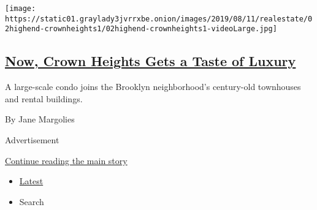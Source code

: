 \begin{enumerate}
  \texttt{[image: https://static01.graylady3jvrrxbe.onion/images/2019/08/11/realestate/02highend-crownheights1/02highend-crownheights1-videoLarge.jpg]}

  \hypertarget{now-crown-heights-gets-a-taste-of-luxury}{%
  \subsection{\texorpdfstring{\href{/2019/08/09/realestate/now-crown-heights-gets-a-taste-of-luxury.html}{Now,
  Crown Heights Gets a Taste of
  Luxury}}{Now, Crown Heights Gets a Taste of Luxury}}\label{now-crown-heights-gets-a-taste-of-luxury}}

  A large-scale condo joins the Brooklyn neighborhood's century-old
  townhouses and rental buildings.

  By Jane Margolies
\end{enumerate}

Advertisement

\protect\hyperlink{after-mid1}{Continue reading the main story}

\begin{itemize}
\tightlist
\item
  \protect\hyperlink{stream-panel}{Latest}
\item
  Search
\end{itemize}

